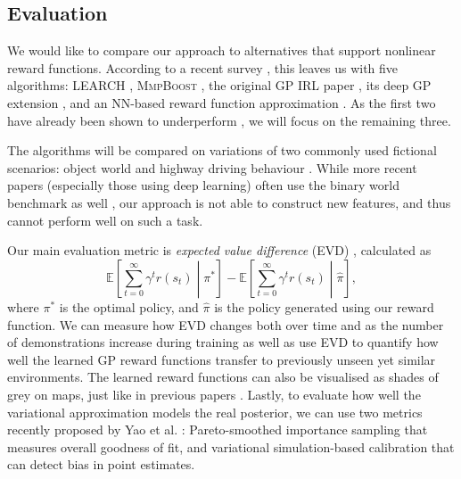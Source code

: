\documentclass{mprop}
\theoremstyle{definition}
\begin{document}
\subsection{Evaluation} \label{sec:evaluation}

We would like to compare our approach to alternatives that support nonlinear
reward functions. According to a recent survey
\cite{DBLP:journals/corr/abs-1806-06877}, this leaves us with five algorithms:
\textsc{LEARCH} \cite{DBLP:journals/arobots/RatliffSB09}, \textsc{MmpBoost}
\cite{DBLP:conf/nips/RatliffBBC06}, the original GP IRL paper
\cite{DBLP:conf/nips/LevinePK11}, its deep GP extension
\cite{DBLP:conf/uai/JinDAS17}, and an NN-based reward function
approximation \cite{wulfmeier2015maximum}. As the first two have already been
shown to underperform \cite{DBLP:conf/nips/LevinePK11}, we will focus on the
remaining three.

The algorithms will be compared on variations of two commonly used fictional
scenarios: object world \cite{DBLP:conf/nips/LevinePK11} and highway driving
behaviour \cite{DBLP:conf/icml/PieterN04,DBLP:conf/nips/LevinePK10}. While more
recent papers (especially those using deep learning) often use the binary world
benchmark as well \cite{DBLP:conf/uai/JinDAS17,wulfmeier2015maximum}, our
approach is not able to construct new features, and thus cannot perform well on
such a task.

Our main evaluation metric is \emph{expected value difference} (EVD)
\cite{DBLP:conf/uai/JinDAS17}, calculated as
\[ \mathbb{E} \left[ \sum_{t=0}^\infty \gamma^tr(s_t) \middle| \pi^* \right] -
  \mathbb{E} \left[ \sum_{t=0}^\infty \gamma^t r(s_t) \middle| \hat\pi
  \right], \]
where $\pi^*$ is the optimal policy, and $\hat\pi$ is the policy generated using
our reward function. We can measure how EVD changes both over time and as the
number of demonstrations increase during training as well as use EVD to quantify
how well the learned GP reward functions transfer to previously unseen yet
similar environments. The learned reward functions can also be visualised as
shades of grey on maps, just like in previous papers
\cite{DBLP:conf/uai/JinDAS17,DBLP:conf/nips/LevinePK11}. Lastly, to evaluate how
well the variational approximation models the real posterior, we can use two
metrics recently proposed by Yao et al. \cite{DBLP:conf/icml/YaoVSG18}:
Pareto-smoothed importance sampling that measures overall goodness of fit, and
variational simulation-based calibration that can detect bias in point
estimates.



\end{document}
